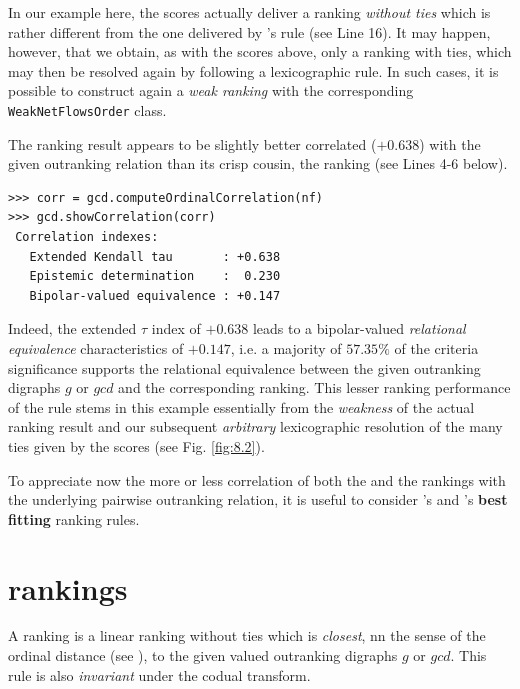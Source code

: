In our example here, the \NetFlows scores actually deliver a ranking \emph{without ties} which is rather different from the one delivered by \Copeland 's rule (see Line 16). It may happen, however, that we obtain, as with the \Copeland scores above, only a ranking with ties, which may then be resolved again by following a lexicographic rule. In such cases, it is possible to construct again a \emph{weak ranking} with the corresponding \texttt{WeakNetFlowsOrder} class.

The \NetFlows ranking result appears to be slightly better correlated ($+0.638$) with the given outranking relation than its crisp cousin, the \Copeland ranking (see Lines 4-6 below).

\begin{lstlisting}[caption={Checking the quality of the \NetFlows Ranking},label=list:8.6]   
>>> corr = gcd.computeOrdinalCorrelation(nf)
>>> gcd.showCorrelation(corr)
 Correlation indexes:
   Extended Kendall tau       : +0.638
   Epistemic determination    :  0.230
   Bipolar-valued equivalence : +0.147
\end{lstlisting}

Indeed, the extended \Kendall $\tau$ index of $+0.638$ leads to a bipolar-valued \emph{relational equivalence} characteristics of $+0.147$, i.e. a majority of $57.35\%$ of the criteria significance supports the relational equivalence between the given outranking digraphs $g$ or $gcd$  and the corresponding \NetFlows ranking. This lesser ranking performance of the \Copeland rule stems in this example essentially from the \emph{weakness} of the actual ranking result and our subsequent \emph{arbitrary} lexicographic resolution of the many ties given by the \Copeland scores (see Fig. \ref{fig:8.2}).

To appreciate now the more or less correlation of both the \Copeland and the \NetFlows rankings with the underlying pairwise outranking relation, it is useful to consider \Kemeny 's and \Slater 's \textbf{best fitting} ranking rules.

\section{\Kemeny rankings}
\label{sec:8.4}

A \Kemeny ranking is a linear ranking without ties which is \emph{closest}, nn the sense of the ordinal \Kendall distance (see \citep{BIS-2012a}), to the given valued outranking digraphs $g$ or $gcd$. This rule is also \emph{invariant} under the codual transform. 

